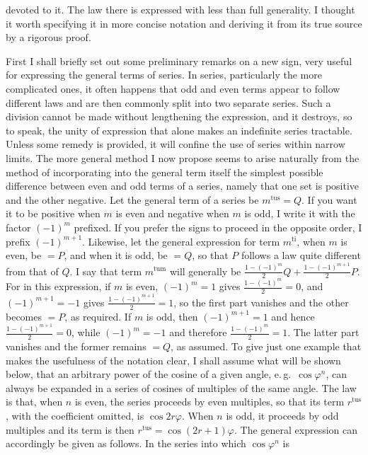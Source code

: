 devoted to it. The law there is expressed with less than full generality. I thought it worth specifying it in more concise notation and deriving it from its true source by a rigorous proof.

First I shall briefly set out some preliminary remarks on a new sign, very useful for expressing the general terms of series. In series, particularly the more complicated ones, it often happens that odd and even terms appear to follow different laws and are then commonly split into two separate series. Such a division cannot be made without lengthening the expression, and it destroys, so to speak, the unity of expression that alone makes an indefinite series tractable. Unless some remedy is provided, it will confine the use of series within narrow limits. The more general method I now propose seems to arise naturally from the method of incorporating into the general term itself the simplest possible difference between even and odd terms of a series, namely that one set is positive and the other negative. Let the general term of a series be $m^{\text{tus}} = Q$. If you want it to be positive when $m$ is even and negative when $m$ is odd, I write it with the factor $(-1)^m$ prefixed. If you prefer the signs to proceed in the opposite order, I prefix $(-1)^{m+1}$. Likewise, let the general expression for term $m^{\text{ti}}$, when $m$ is even, be $= P$, and when it is odd, be $= Q$, so that $P$ follows a law quite different from that of $Q$. I say that term $m^{\text{tum}}$ will generally be $\frac{1-(-1)^m}{2}Q+\frac{1-(-1)^{m+1}}{2}P$. For in this expression, if $m$ is even, $(-1)^m=1$ gives $\frac{1-(-1)^m}{2}=0$, and $(-1)^{m+1}=-1$ gives $\frac{1-(-1)^{m+1}}{2}=1$, so the first part vanishes and the other becomes $=P$, as required. If $m$ is odd, then $(-1)^{m+1}=1$ and hence $\frac{1-(-1)^{m+1}}{2}=0$, while $(-1)^m=-1$ and therefore $\frac{1-(-1)^m}{2}=1$. The latter part vanishes and the former remains $=Q$, as assumed. To give just one example that makes the usefulness of the notation clear, I shall assume what will be shown below, that an arbitrary power of the cosine of a given angle, e.\,g.\ $\cos\varphi^n$, can always be expanded in a series of cosines of multiples of the same angle. The law is that, when $n$ is even, the series proceeds by even multiples, so that its term $r^{\text{tus}}$, with the coefficient omitted, is $\cos 2r\varphi$. When $n$ is odd, it proceeds by odd multiples and its term is then $r^{\text{tus}} = \cos(2r+1)\varphi$. The general expression can accordingly be given as follows. In the series into which $\cos\varphi^n$ is%
